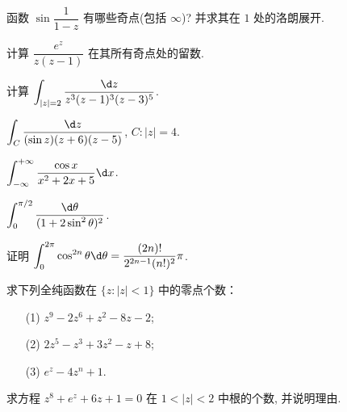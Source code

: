 \item 函数 $\sin\dfrac{1}{1-z}$ 有哪些奇点(包括 $\infty$)? 并求其在 $1$ 处的洛朗展开.
\item 计算 $\dfrac{e^z}{z(z-1)}$ 在其所有奇点处的留数.

\item 计算 $\displaystyle\int_{|z|=2}\frac{\d z}{z^3(z-1)^3(z-3)^5}$.

\item $\displaystyle\int_C\dfrac{\d z}{(\sin z)(z+6)(z-5)}$, $C:|z|=4$.
\item $\displaystyle\int_{-\infty}^{+\infty}\dfrac{\cos x}{x^2+2x+5}\d x$.
\item $\displaystyle\int_0^{\pi/2}\dfrac{\d \theta}{(1+2\sin^2\theta)^2}$.

\item 证明 $\displaystyle\int_0^{2\pi}\cos^{2n}\theta\d \theta=\dfrac{(2n)!}{2^{2n-1}(n!)^2}\pi$.

\item 求下列全纯函数在 $\{z:|z|<1\}$ 中的零点个数：
\begin{enumerate}
\item[(1)] $z^9-2z^6+z^2-8z-2$;
\item[(2)] $2z^5-z^3+3z^2-z+8$;
\item[(3)] $e^z-4z^n+1$.
\end{enumerate}


\item 求方程 $z^8+e^z+6z+1=0$ 在 $1<|z|<2$ 中根的个数, 并说明理由.